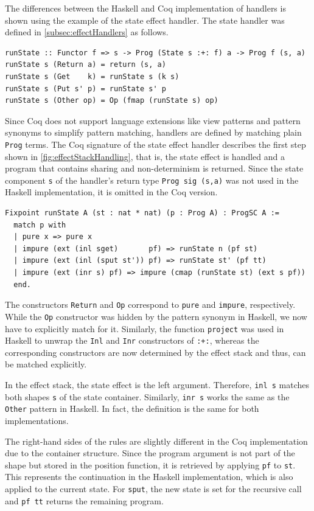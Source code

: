 \documentclass[a4paper, 11pt, fleqn, twoside, abstract=on]{scrreprt}
\newcommand{\hinl}[1]{\texttt{#1}}
\newcommand{\cinl}[1]{\texttt{#1}}
\begin{document}
The differences between the Haskell and Coq implementation of handlers is shown using the example of the state effect handler.
The state handler was defined in \autoref{subsec:effectHandlers} as follows.

\begin{verbatim}
runState :: Functor f => s -> Prog (State s :+: f) a -> Prog f (s, a)
runState s (Return a) = return (s, a)
runState s (Get    k) = runState s (k s)
runState s (Put s' p) = runState s' p
runState s (Other op) = Op (fmap (runState s) op)
\end{verbatim}

Since Coq does not support language extensions like view patterns and pattern synonyms to simplify pattern matching, handlers are defined by matching plain \cinl{Prog} terms.
The Coq signature of the state effect handler describes the first step shown in \autoref{fig:effectStackHandling}, that is, the state effect is handled and a program that contains sharing and non-determinism is returned.
Since the state component \hinl{s} of the handler's return type \hinl{Prog sig (s,a)} was not used in the Haskell implementation, it is omitted in the Coq version.

\begin{verbatim}
Fixpoint runState A (st : nat * nat) (p : Prog A) : ProgSC A :=
  match p with
  | pure x => pure x
  | impure (ext (inl sget)       pf) => runState n (pf st)
  | impure (ext (inl (sput st')) pf) => runState st' (pf tt)
  | impure (ext (inr s) pf) => impure (cmap (runState st) (ext s pf))
  end.
\end{verbatim}
\noindent
The constructors \hinl{Return} and \hinl{Op} correspond to \cinl{pure} and \cinl{impure}, respectively.
While the \hinl{Op} constructor was hidden by the pattern synonym in Haskell, we now have to explicitly match for it.
Similarly, the function \hinl{project} was used in Haskell to unwrap the \hinl{Inl} and \hinl{Inr} constructors of \hinl{:+:}, whereas the corresponding constructors are now determined by the effect stack and thus, can be matched explicitly.

In the effect stack, the state effect is the left argument.
Therefore, \cinl{inl s} matches both shapes \cinl{s} of the state container.
Similarly, \cinl{inr s} works the same as the \hinl{Other} pattern in Haskell.
In fact, the definition is the same for both implementations.

The right-hand sides of the rules are slightly different in the Coq implementation due to the container structure.
Since the program argument is not part of the shape but stored in the position function, it is retrieved by applying \cinl{pf} to \cinl{st}.
This represents the continuation in the Haskell implementation, which is also applied to the current state.
For \cinl{sput}, the new state is set for the recursive call and \cinl{pf tt} returns the remaining program.
\end{document}
